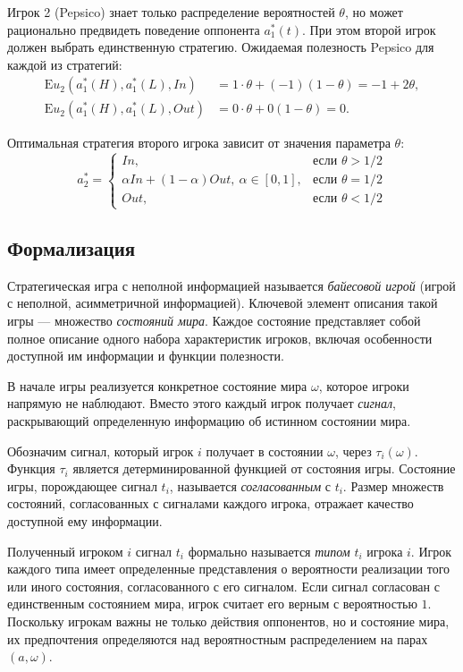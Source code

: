 \begin{example}
Игрок 2 (Pepsico) знает только распределение вероятностей $\theta$, но может рационально предвидеть поведение оппонента $a_1^*(t)$. При этом второй игрок должен выбрать единственную стратегию. Ожидаемая полезность Pepsico для каждой из стратегий:
\begin{align*}
    \mathrm{E}u_2(a_1^*(H), a_1^*(L), In) &= 1\cdot\theta + (-1)(1 - \theta) = -1 + 2\theta, \\
    \mathrm{E}u_2(a_1^*(H), a_1^*(L), Out) &= 0\cdot\theta + 0(1 - \theta) = 0.
\end{align*}

Оптимальная стратегия второго игрока зависит от значения параметра $\theta$:
\[
a_2^* = 
\begin{cases}
    In, & \text{если } \theta > 1/2 \\
    \alpha In + (1 - \alpha) Out, \: \alpha \in [0, 1], & \text{если } \theta = 1/2 \\
    Out, & \text{если } \theta < 1/2
\end{cases}
\]
\end{example}

\subsection{Формализация}

Стратегическая игра с неполной информацией называется \textit{байесовой игрой} (игрой с неполной, асимметричной информацией). Ключевой элемент описания такой игры — множество \textit{состояний мира}. Каждое состояние представляет собой полное описание одного набора характеристик игроков, включая особенности доступной им информации и функции полезности.

В начале игры реализуется конкретное состояние мира $\omega$, которое игроки напрямую не наблюдают. Вместо этого каждый игрок получает \textit{сигнал}, раскрывающий определенную информацию об истинном состоянии мира. 

Обозначим сигнал, который игрок $i$ получает в состоянии $\omega$, через $\tau_i(\omega)$. Функция $\tau_i$ является детерминированной функцией от состояния игры. Состояние игры, порождающее сигнал $t_i$, называется \textit{согласованным} с $t_i$. Размер множеств состояний, согласованных с сигналами каждого игрока, отражает качество доступной ему информации.

Полученный игроком $i$ сигнал $t_i$ формально называется \textit{типом} $t_i$ игрока $i$. Игрок каждого типа имеет определенные представления о вероятности реализации того или иного состояния, согласованного с его сигналом. Если сигнал согласован с единственным состоянием мира, игрок считает его верным с вероятностью $1$. Поскольку игрокам важны не только действия оппонентов, но и состояние мира, их предпочтения определяются над вероятностным распределением на парах $(a, \omega)$.

